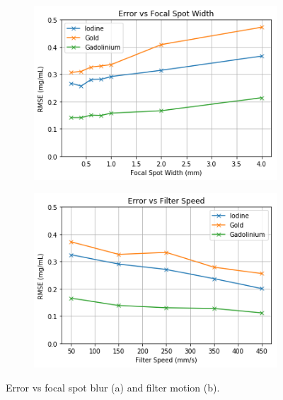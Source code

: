 \documentclass[]{spie}  %
\begin{document}
\begin{figure}
\centering
\begin{subfigure}{.49\textwidth}
  \centering
  \includegraphics[width=\linewidth]{figures/trend_FocalSpotWidth_vs_RMSE}
  \caption{}
  \label{fig:trendFocalSpot}
\end{subfigure}%
\begin{subfigure}{.49\textwidth}
  \centering
  \includegraphics[width=\linewidth]{figures/trend_FilterSpeed_vs_RMSE}
  \caption{}
  \label{fig:trendFilterSpeed}
\end{subfigure}
\caption{Error vs focal spot blur (a) and filter motion (b).}
\label{fig:trendPlots}
\end{figure}
\end{document}
